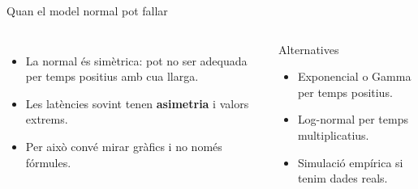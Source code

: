 \documentclass[10pt,aspectratio=169]{beamer}
\newcommand{\important}[1]{\textcolor{UABGreen}{\textbf{#1}}}
\begin{document}
\begin{frame}[fragile]{Quan el model normal pot fallar}
\begin{columns}[T]
\begin{itemize}
  \item La normal és simètrica: pot no ser adequada per temps positius amb cua llarga.
  \item Les latències sovint tenen \important{asimetria} i valors extrems.
  \item Per això convé mirar gràfics i no només fórmules.
\end{itemize}
\begin{block}{Alternatives}
\begin{itemize}
  \item Exponencial o Gamma per temps positius.
  \item Log-normal per temps multiplicatius.
  \item Simulació empírica si tenim dades reals.
\end{itemize}
\end{block}
\end{columns}
\end{frame}
\end{document}
